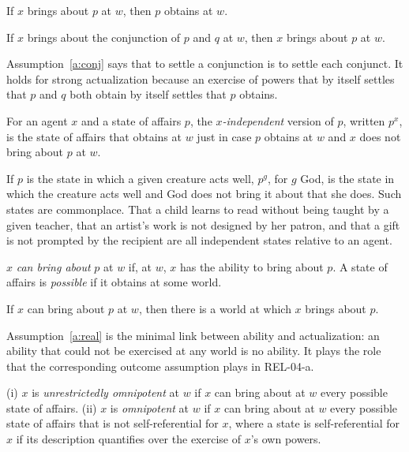 \documentclass{situationist-preprint}
\begin{document}
\begin{assumption}[Factivity]\label{a:factive}
If $x$ brings about $p$ at $w$, then $p$ obtains at $w$.
\end{assumption}

\begin{assumption}[Conjunction]\label{a:conj}
If $x$ brings about the conjunction of $p$ and $q$ at $w$, then $x$ brings about $p$ at $w$.
\end{assumption}

Assumption~\ref{a:conj} says that to settle a conjunction is to settle each conjunct. It holds for strong actualization because an exercise of powers that by itself settles that $p$ and $q$ both obtain by itself settles that $p$ obtains.

\begin{definition}\label{d:indep}
For an agent $x$ and a state of affairs $p$, the \emph{$x$-independent} version of $p$, written $p^{x}$, is the state of affairs that obtains at $w$ just in case $p$ obtains at $w$ and $x$ does not bring about $p$ at $w$.
\end{definition}

If $p$ is the state in which a given creature acts well, $p^{g}$, for $g$ God, is the state in which the creature acts well and God does not bring it about that she does. Such states are commonplace. That a child learns to read without being taught by a given teacher, that an artist's work is not designed by her patron, and that a gift is not prompted by the recipient are all independent states relative to an agent.

\begin{definition}\label{d:can}
$x$ \emph{can bring about} $p$ at $w$ if, at $w$, $x$ has the ability to bring about $p$. A state of affairs is \emph{possible} if it obtains at some world.
\end{definition}

\begin{assumption}[Realization]\label{a:real}
If $x$ can bring about $p$ at $w$, then there is a world at which $x$ brings about $p$.
\end{assumption}

Assumption~\ref{a:real} is the minimal link between ability and actualization: an ability that could not be exercised at any world is no ability. It plays the role that the corresponding outcome assumption plays in REL-04-a.

\begin{definition}[Omnipotence]\label{d:omni}
(i) $x$ is \emph{unrestrictedly omnipotent} at $w$ if $x$ can bring about at $w$ every possible state of affairs. (ii) $x$ is \emph{omnipotent} at $w$ if $x$ can bring about at $w$ every possible state of affairs that is not self-referential for $x$, where a state is self-referential for $x$ if its description quantifies over the exercise of $x$'s own powers.
\end{definition}
\end{document}
